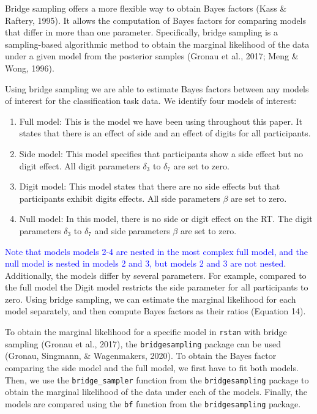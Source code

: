 \documentclass[
  english,
  doc,floatsintext]{apa6}
\providecommand{\tightlist}{%
  \setlength{\itemsep}{0pt}\setlength{\parskip}{0pt}}
\begin{document}
Bridge sampling offers a more flexible way to obtain Bayes factors (Kass \& Raftery, 1995). It allows the computation of Bayes factors for comparing models that differ in more than one parameter. Specifically, bridge sampling is a sampling-based algorithmic method to obtain the marginal likelihood of the data under a given model from the posterior samples (Gronau et al., 2017; Meng \& Wong, 1996).

Using bridge sampling we are able to estimate Bayes factors between any models of interest for the classification task data. We identify four models of interest:

\begin{enumerate}
\def\labelenumi{\arabic{enumi}.}
\tightlist
\item
  Full model: This is the model we have been using throughout this paper. It states that there is an effect of side and an effect of digits for all participants.
\item
  Side model: This model specifies that participants show a side effect but no digit effect. All digit parameters \(\delta_{3}\) to \(\delta_{7}\) are set to zero.
\item
  Digit model: This model states that there are no side effects but that participants exhibit digits effects. All side parameters \(\beta\) are set to zero.
\item
  Null model: In this model, there is no side or digit effect on the RT. The digit parameters \(\delta_{3}\) to \(\delta_{7}\) and side parameters \(\beta\) are set to zero.
\end{enumerate}

\textcolor{blue}{Note that models models 2-4 are nested in the most complex full model, and the null model is nested in models 2 and 3, but models 2 and 3 are not nested}. Additionally, the models differ by several parameters. For example, compared to the full model the Digit model restricts the side parameter for all participants to zero. Using bridge sampling, we can estimate the marginal likelihood for each model separately, and then compute Bayes factors as their ratios (Equation 14).

To obtain the marginal likelihood for a specific model in \texttt{rstan} with bridge sampling (Gronau et al., 2017), the \texttt{bridgesampling} package can be used (Gronau, Singmann, \& Wagenmakers, 2020). To obtain the Bayes factor comparing the side model and the full model, we first have to fit both models. Then, we use the \texttt{bridge\_sampler} function from the \texttt{bridgesampling} package to obtain the marginal likelihood of the data under each of the models. Finally, the models are compared using the \texttt{bf} function from the \texttt{bridgesampling} package.
~
\end{document}
